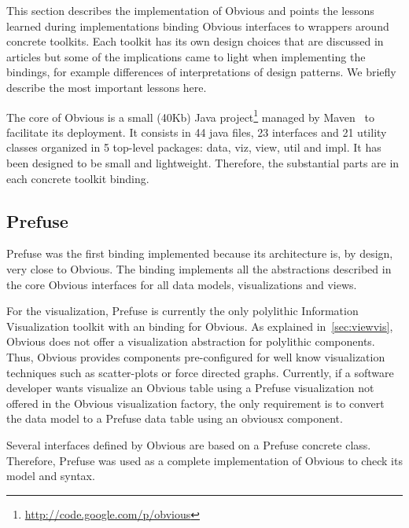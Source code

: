 This section describes the implementation of Obvious and points the
lessons learned during implementations binding Obvious interfaces to
wrappers around concrete toolkits.  Each toolkit has its own design
choices that are discussed in articles but some of the implications
came to light when implementing the bindings, for example differences
of interpretations of design patterns.  We briefly describe the most
important lessons here.

The core of Obvious is a small (40Kb) Java
project\footnote{\url{http://code.google.com/p/obvious}} managed by
Maven~\cite{Maven} to facilitate its deployment.  It consists in 44
java files, 23 interfaces and 21 utility classes organized in 5
top-level packages: data, viz, view, util and impl.  It has been
designed to be small and lightweight.  Therefore, the substantial
parts are in each concrete toolkit binding.

\subsection{Prefuse}

Prefuse was the first binding implemented because its architecture is,
by design, very close to Obvious.  The binding implements all the
abstractions described in the core Obvious interfaces for all data
models, visualizations and views.

For the visualization, Prefuse is currently the only polylithic
Information Visualization toolkit with an binding for Obvious.  As
explained in~\ref{sec:viewvis}, Obvious does not offer a visualization
abstraction for polylithic components.  Thus, Obvious provides
components pre-configured for well know visualization techniques such
as scatter-plots or force directed graphs.  Currently, if a software
developer wants visualize an Obvious table using a Prefuse
visualization not offered in the Obvious visualization factory, the
only requirement is to convert the data model to a Prefuse data table
using an obviousx component.  


Several interfaces defined by Obvious are based on a Prefuse concrete
class.  Therefore, Prefuse was used as a complete implementation of
Obvious to check its model and syntax.

